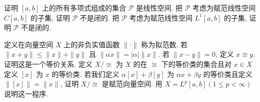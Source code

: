 \documentclass[../../main.tex]{subfiles}
\begin{document}
\begin{exercise}\label{exercise:ch13-07}
证明 $[a,b]$ 上的所有多项式组成的集合 $\mathcal{P}$ 是线性空间. 把 $\mathcal{P}$ 考虑为赋范线性空间 $C[a,b]$ 的子集, 证明 $\mathcal{P}$ 不是闭的. 把 $\mathcal{P}$ 考虑为赋范线性空间 $L^{1}[a,b]$ 的子集, 证明 $\mathcal{P}$ 不是闭的.
\end{exercise}

\begin{exercise}\label{exercise:ch13-08}
定义在向量空间 $X$ 上的非负实值函数 $\|\cdot\|$ 称为拟范数, 若 $\|x+y\|\leqslant\|x\|+\|y\|$ 且 $\|\alpha x\|=|\alpha|\|x\|$. 若 $\|x-y\|=0$, 定义 $x\cong y$. 证明这是一个等价关系. 定义 $X/\cong$ 为 $X$ 的在 $\cong$ 下的等价类的集合且对 $x\in X$ 定义 $[x]$ 为 $x$ 的等价类. 若我们定义 $\alpha[x]+\beta[y]$ 为 $\alpha x+\beta y$ 的等价类且定义 $\|[x]\|=\|x\|$, 证明 $X/\cong$ 是赋范向量空间. 用 $X=L^{p}[a,b](1\leqslant p<\infty)$ 说明这一程序.
\end{exercise}
\end{document}
